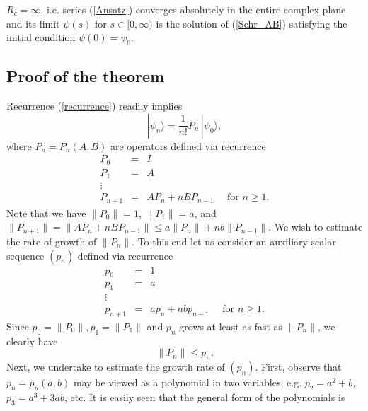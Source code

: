 \documentclass[11 pt]{article}
\begin{document}
\begin{theorem}\label{Radius_infty}
$R_c = \infty$, i.e. series (\ref{Ansatz}) converges absolutely in the entire complex plane and its limit $\psi(s)$ for $s\in [0, \infty)$ is the solution of (\ref{Schr_AB}) satisfying the initial condition $\psi(0) = \psi_0$.
\end{theorem}



\subsection{Proof of the theorem}
\label{proof_section}

Recurrence (\ref{recurrence}) readily implies
\begin{equation}\label{psi_from_P}
|\psi_n\rangle = \frac{1}{n !}P_n\, |\psi_0\rangle,
\end{equation}
where $P_n = P_n(A,B)$ are operators defined via recurrence
\begin{equation}\label{recurrence_P}
\begin{array}{lll}
P_0 &= &I \\
P_1  &=& A \\
\vdots & &\\
P_{n+1} & = & AP_n + nBP_{n-1}\quad \mbox{ for } n\geq 1.
\end{array}
\end{equation}
Note that we have $\|P_0\| =1$, $\|P_1\| = a$, and $\|P_{n+1}\| = \| AP_n + nBP_{n-1}\| \leq a \|P_n\| +n b \|P_{n-1}\|$. We wish to estimate the rate of growth of $\|P_n\|$. To this end let us consider an auxiliary scalar sequence $(p_n)$ defined via recurrence
\begin{equation}\label{recurrence_p}
\begin{array}{lll}
p_0 &= &1 \\
p_1  &=& a \\
\vdots & &\\
p_{n+1} & = & ap_n + nbp_{n-1}\quad \mbox{ for } n\geq 1.
\end{array}
\end{equation}
Since $p_0 = \|P_0\|, p_1 =\|P_1\|$ and $p_n$ grows at least as fast as $\|P_n\|$, we clearly have
\begin{equation}\label{stage}
\|P_n\| \leq p_n.
\end{equation}
 Next, we undertake to estimate the growth rate of $(p_n)$. First, observe that $p_n = p_n(a,b)$ may be viewed as a polynomial in two variables, e.g. $p_2 = a^2 +b$, $p_3 = a^3 + 3ab$, etc. It is easily seen that the general form of the polynomials is
\end{document}
